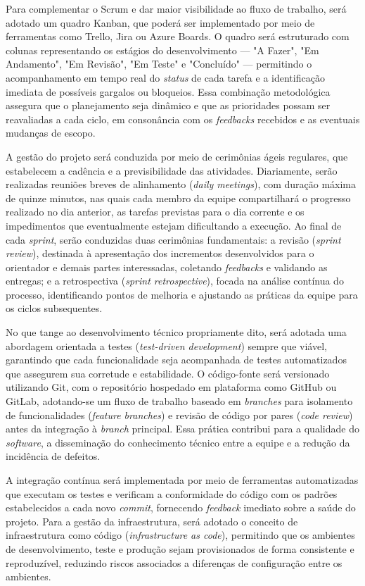 Para complementar o Scrum e dar maior visibilidade ao fluxo de trabalho, será adotado um quadro Kanban, que poderá ser implementado por meio de ferramentas como Trello, Jira ou Azure Boards. O quadro será estruturado com colunas representando os estágios do desenvolvimento --- "A Fazer", "Em Andamento", "Em Revisão", "Em Teste" e "Concluído" --- permitindo o acompanhamento em tempo real do \textit{status} de cada tarefa e a identificação imediata de possíveis gargalos ou bloqueios. Essa combinação metodológica assegura que o planejamento seja dinâmico e que as prioridades possam ser reavaliadas a cada ciclo, em consonância com os \textit{feedbacks} recebidos e as eventuais mudanças de escopo.

A gestão do projeto será conduzida por meio de cerimônias ágeis regulares, que estabelecem a cadência e a previsibilidade das atividades. Diariamente, serão realizadas reuniões breves de alinhamento (\textit{daily meetings}), com duração máxima de quinze minutos, nas quais cada membro da equipe compartilhará o progresso realizado no dia anterior, as tarefas previstas para o dia corrente e os impedimentos que eventualmente estejam dificultando a execução. Ao final de cada \textit{sprint}, serão conduzidas duas cerimônias fundamentais: a revisão (\textit{sprint review}), destinada à apresentação dos incrementos desenvolvidos para o orientador e demais partes interessadas, coletando \textit{feedbacks} e validando as entregas; e a retrospectiva (\textit{sprint retrospective}), focada na análise contínua do processo, identificando pontos de melhoria e ajustando as práticas da equipe para os ciclos subsequentes.

No que tange ao desenvolvimento técnico propriamente dito, será adotada uma abordagem orientada a testes (\textit{test-driven development}) sempre que viável, garantindo que cada funcionalidade seja acompanhada de testes automatizados que assegurem sua corretude e estabilidade. O código-fonte será versionado utilizando Git, com o repositório hospedado em plataforma como GitHub ou GitLab, adotando-se um fluxo de trabalho baseado em \textit{branches} para isolamento de funcionalidades (\textit{feature branches}) e revisão de código por pares (\textit{code review}) antes da integração à \textit{branch} principal. Essa prática contribui para a qualidade do \textit{software}, a disseminação do conhecimento técnico entre a equipe e a redução da incidência de defeitos.

A integração contínua será implementada por meio de ferramentas automatizadas que executam os testes e verificam a conformidade do código com os padrões estabelecidos a cada novo \textit{commit}, fornecendo \textit{feedback} imediato sobre a saúde do projeto. Para a gestão da infraestrutura, será adotado o conceito de infraestrutura como código (\textit{infrastructure as code}), permitindo que os ambientes de desenvolvimento, teste e produção sejam provisionados de forma consistente e reproduzível, reduzindo riscos associados a diferenças de configuração entre os ambientes.

